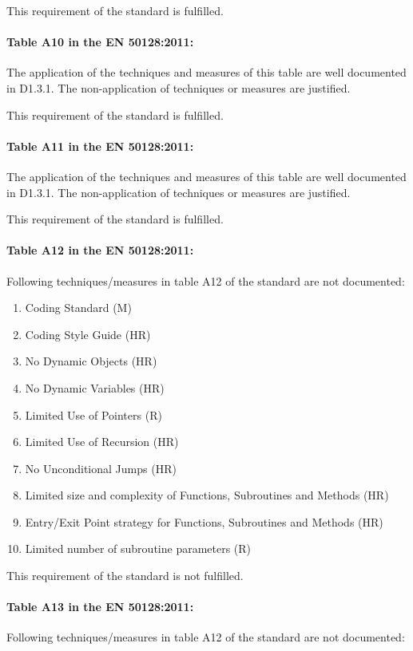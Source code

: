 This requirement of the standard is fulfilled.

\paragraph{Table A10 in the EN 50128:2011:}
The application of the techniques and measures of this table are well documented in D1.3.1. The non-application of techniques or measures are justified.

This requirement of the standard is fulfilled.

\paragraph{Table A11 in the EN 50128:2011:}
The application of the techniques and measures of this table are well documented in D1.3.1. The non-application of techniques or measures are justified.

This requirement of the standard is fulfilled.

\paragraph{Table A12 in the EN 50128:2011:}
Following techniques/measures in table A12 of the standard are not documented:

\begin{enumerate}
\item	Coding Standard (M)
\item	Coding Style Guide (HR)
\item	No Dynamic Objects (HR)
\item	No Dynamic Variables (HR)
\item	Limited Use of Pointers (R)
\item	Limited Use of Recursion (HR)
\item	No Unconditional Jumps (HR)
\item	Limited size and complexity of Functions, Subroutines and Methods (HR)
\item	Entry/Exit Point strategy for Functions, Subroutines and Methods (HR)
\item	Limited number of subroutine parameters (R)
\end{enumerate}

This requirement of the standard is not fulfilled.

\paragraph{Table A13 in the EN 50128:2011:}
Following techniques/measures in table A12 of the standard are not documented:

